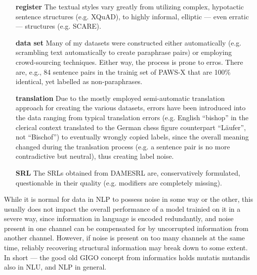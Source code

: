 \begin{itemize}
  \item[\textbf{register}] The textual styles vary greatly from utilizing complex,
                           hypotactic sentence structures (e.g. XQuAD), to highly
                           informal, elliptic --- even erratic --- structures
                           (e.g. SCARE).
 \item[\textbf{data set}] Many of my datasets were constructed either automatically
                         (e.g. scrambling text automatically to create paraphrase pairs)
                         or employing crowd-sourcing techniques. Either way, the process
                         is prone to erros. There are, e.g., 84 sentence pairs in the trainig
                         set of PAWS-X that are 100\% identical, yet labelled as non-paraphrases.
 \item[\textbf{translation}] Due to the mostly employed semi-automatic translation
                             approach for creating the various datasets, errors
                             have been introduced into the data ranging from typical
                             translation errors (e.g. English ``bishop'' in the clerical
                             context translated to the German chess figure counterpart
                             ``Läufer'', not ``Bischof'') to eventually wrongly copied
                             labels, since the overall meaning changed during
                             the tranlsation process (e.g. a sentence pair is no more
                             contradictive but neutral), thus creating label noise.
 \item[\textbf{SRL}] The SRLs obtained from DAMESRL are, conservatively formulated,
                     questionable in their quality (e.g. modifiers are completely missing).
\end{itemize}

While it is normal for data in NLP to possess noise in some way or the other, this usually does
not impact the overall performance of a model trainied on it in a severe way, since information
in language is encoded redundantly, and noise present in one channel can be compensated for by
uncorrupted information from another channel. However, if noise
is present on too many channels at the same time, reliably recovering structural information may
break down to some extent. In short --- the good old GIGO concept from informatics holds mutatis
mutandis also in NLU, and NLP in general.



